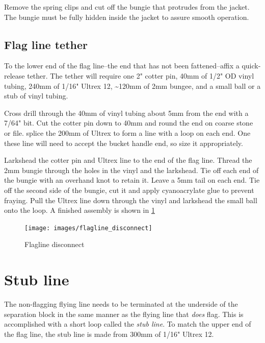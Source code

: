 \documentclass[
]{book}
\begin{document}
Remove the spring clips and cut off the bungie that protrudes from the jacket. The bungie must be fully hidden inside the jacket to assure smooth operation.

\hypertarget{flag-line-tether}{%
\subsection{Flag line tether}\label{flag-line-tether}}

To the lower end of the flag line--the end that has not been fattened--affix a quick-release tether. The tether will require one 2" cotter pin, 40mm of 1/2" OD vinyl tubing, 240mm of 1/16" Ultrex 12, \textasciitilde120mm of 2mm bungee, and a small ball or a stub of vinyl tubing.

Cross drill through the 40mm of vinyl tubing about 5mm from the end with a 7/64" bit. Cut the cotter pin down to 40mm and round the end on coarse stone or file. splice the 200mm of Ultrex to form a line with a loop on each end. One these line will need to accept the bucket handle end, so size it appropriately.

Larkshead the cotter pin and Ultrex line to the end of the flag line. Thread the 2mm bungie through the holes in the vinyl and the larkshead. Tie off each end of the bungie with an overhand knot to retain it. Leave a 5mm tail on each end. Tie off the second side of the bungie, cut it and apply cyanoacrylate glue to prevent fraying. Pull the Ultrex line down through the vinyl and larkshead the small ball onto the loop. A finished assembly is shown in \ref{fig:flagline-disconnect}

\begin{figure}

{\centering \texttt{[image: images/flagline\_disconnect]} 

}

\caption{Flagline disconnect}\label{fig:flagline-disconnect}
\end{figure}

\hypertarget{stub-line}{%
\section{Stub line}\label{stub-line}}

The non-flagging flying line needs to be terminated at the underside of the separation block in the same manner as the flying line that \emph{does} flag. This is accomplished with a short loop called the \emph{stub line}. To match the upper end of the flag line, the stub line is made from 300mm of 1/16" Ultrex 12.
\end{document}
